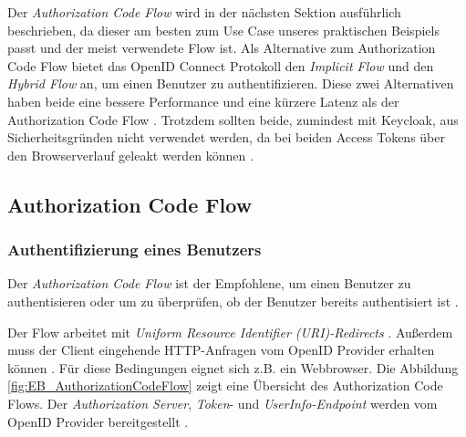 Der \textit{Authorization Code Flow} wird in der nächsten Sektion ausführlich beschrieben, da dieser am besten zum Use Case unseres praktischen Beispiels passt und der meist verwendete Flow ist. Als Alternative zum Authorization Code Flow bietet das OpenID Connect Protokoll den \textit{Implicit Flow} und den \textit{Hybrid Flow} an, um einen Benutzer zu authentifizieren. Diese zwei Alternativen haben beide eine bessere Performance \cite[Implicit and Hybrid Flow]{EB26} und eine kürzere Latenz als der Authorization Code Flow \cite[Code Flow]{EB20}. Trotzdem sollten beide, zumindest mit Keycloak, aus Sicherheitsgründen nicht verwendet werden, da bei beiden Access Tokens über den Browserverlauf geleakt werden können \cite{EB26} \cite[Implicit Flow]{SSEB_keycloakDocs}.

\subsection{Authorization Code Flow}

\subsubsection{Authentifizierung eines Benutzers} \label{EB_Authentifizierung_eines_Benutzers}

Der \textit{Authorization Code Flow} ist der Empfohlene, um einen Benutzer zu authentisieren oder um zu überprüfen, ob der Benutzer bereits authentisiert ist \cite[Authorization Code Flow]{SSEB_keycloakDocs}. 

Der Flow arbeitet mit \textit{Uniform Resource Identifier (URI)-Redirects} \cite{EB12}. Außerdem muss der Client eingehende HTTP-Anfragen vom OpenID Provider erhalten können \cite{EB12}. Für diese Bedingungen eignet sich z.B. ein Webbrowser. Die Abbildung \ref{fig:EB_AuthorizationCodeFlow} zeigt eine Übersicht des Authorization Code Flows. Der \textit{Authorization Server}, \textit{Token}- und \textit{UserInfo-Endpoint} werden vom OpenID Provider bereitgestellt \cite{EB12} \cite[Keycloak URI Endpoints]{SSEB_keycloakDocs}.

